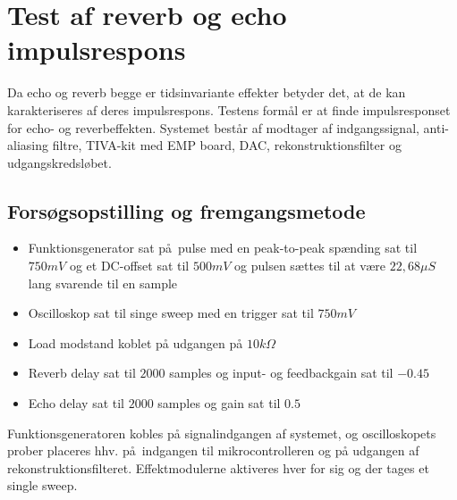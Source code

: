 \chapter{Test af reverb og echo impulsrespons}\label{sec:test_af_effekt}
Da echo og reverb begge er tidsinvariante effekter betyder det, at de kan karakteriseres af deres impulsrespons.\newline
Testens formål er at finde impulsresponset for echo- og reverbeffekten.
Systemet består af modtager af indgangssignal, anti-aliasing filtre, TIVA-kit med EMP board, DAC, rekonstruktionsfilter og udgangskredsløbet.
\section{Forsøgsopstilling og fremgangsmetode}
\begin{itemize}
	\item Funktionsgenerator sat på pulse med en peak-to-peak spænding sat til $750\si{mV}$ og et DC-offset sat til $500\si{mV}$ og pulsen sættes til at være $22,68\si{\mu S}$ lang svarende til en sample
	\item Oscilloskop sat til singe sweep med en trigger sat til $750\si{mV}$
	\item Load modstand koblet på udgangen på $10\si{k\Omega}$
	\item Reverb delay sat til $2000$ samples og input- og feedbackgain sat til $-0.45$
	\item Echo delay sat til $2000$ samples og gain sat til $0.5$
\end{itemize}
Funktionsgeneratoren kobles på signalindgangen af systemet, og oscilloskopets prober placeres hhv. på indgangen til mikrocontrolleren og på udgangen af rekonstruktionsfilteret.\newline
Effektmodulerne aktiveres hver for sig og der tages et single sweep.
